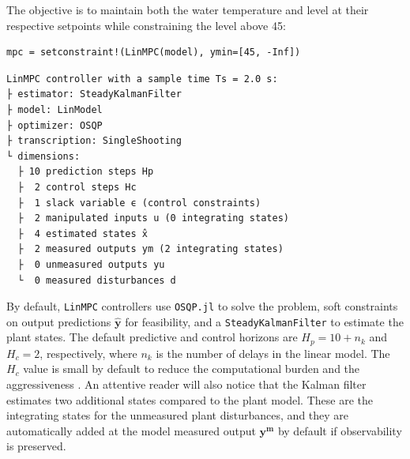 The objective is to maintain both the water temperature and level at their respective setpoints while constraining the level above 45:
\begin{verbatim}
mpc = setconstraint!(LinMPC(model), ymin=[45, -Inf])
\end{verbatim}
\spacerepl
\begin{verbatim}
LinMPC controller with a sample time Ts = 2.0 s:
├ estimator: SteadyKalmanFilter
├ model: LinModel
├ optimizer: OSQP 
├ transcription: SingleShooting
└ dimensions:
  ├ 10 prediction steps Hp
  ├  2 control steps Hc
  ├  1 slack variable ϵ (control constraints)
  ├  2 manipulated inputs u (0 integrating states)
  ├  4 estimated states x̂
  ├  2 measured outputs ym (2 integrating states)
  ├  0 unmeasured outputs yu
  └  0 measured disturbances d
\end{verbatim}
By default, \texttt{LinMPC} controllers use \texttt{OSQP.jl} \citep{osqp} to solve the problem, soft constraints on output predictions $\mathbf{\hat y}$ for feasibility, and a \texttt{SteadyKalmanFilter} to estimate the plant states. The default predictive and control horizons are $H_p = 10 + n_k$ and $H_c = 2$, respectively, where $n_k$ is the number of delays in the linear model. The $H_c$ value is small by default to reduce the computational burden and the aggressiveness \citep{mpcHcAnalysis}. An attentive reader will also notice that the Kalman filter estimates two additional states compared to the plant model. These are the integrating states for the unmeasured plant disturbances, and they are automatically added at the model measured output $\mathbf{y^m}$ by default if observability is preserved.

